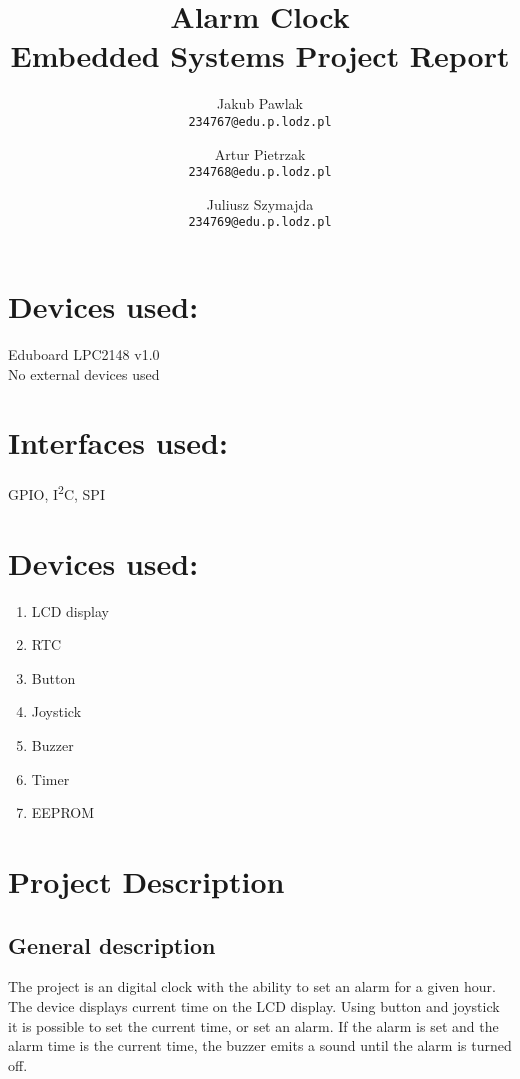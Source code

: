 \documentclass[10pt]{article}
\title{\huge\bf\vspace{-1em} Alarm Clock \\ Embedded Systems Project Report\\\vspace{2em}{\large\normalfont Monday 10:00 lab} }
\author{
    Jakub Pawlak \\
    \texttt{234767@edu.p.lodz.pl}
    \and
    Artur Pietrzak \\
    \texttt{234768@edu.p.lodz.pl}
    \and
    Juliusz Szymajda \\
    \texttt{234769@edu.p.lodz.pl}
}
\begin{document}
    \maketitle
    \clearpage
    \large
    \section*{Devices used:}
    Eduboard LPC2148 v1.0 \\[1em]
    No external devices used
    \section*{Interfaces used:}
    GPIO, I\textsuperscript{2}C, SPI
    \section*{Devices used:}
    \begin{enumerate}
        \item LCD display
        \item RTC
        \item Button
        \item Joystick
        \item Buzzer
        \item Timer
        \item EEPROM
    \end{enumerate}
    \clearpage
    \tableofcontents
    \clearpage

    \section{Project Description}
    \subsection{General description}
    The project is an digital clock with the ability to set an alarm for a given hour.
    The device displays current time on the LCD display.
    Using button and joystick it is possible to set the current time, or set an alarm.
    If the alarm is set and the alarm time is the current time, the buzzer emits a sound until the alarm is turned off.
\end{document}
